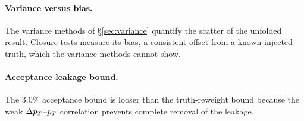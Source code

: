\paragraph{Variance versus bias.} The variance methods of \S\ref{sec:variance} quantify the scatter of the unfolded result. Closure tests measure its bias, a consistent offset from a known injected truth, which the variance methods cannot show.

\paragraph{Acceptance leakage bound.} The $3.0\%$ acceptance bound is looser than the truth-reweight bound because the weak $\Delta p_{T}$--$p_{T}$ correlation prevents complete removal of the leakage.

